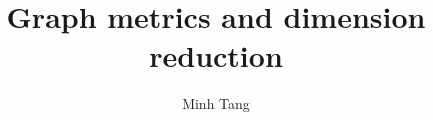 \documentclass[12pt,oneside]{book}
\begin{document}
\title{Graph metrics and dimension reduction}
\author{Minh Tang}
\maketitle
{}
\setcounter{page}{2}
\tableofcontents
\pagebreak
{}





\appendix


\end{document}
